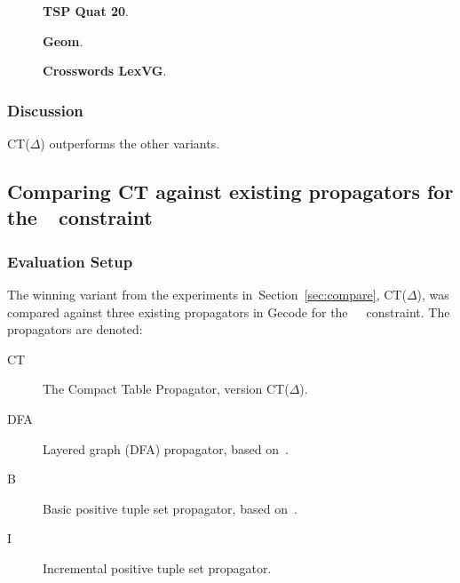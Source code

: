 \documentclass[a4paper,11pt]{article}
\newcommand{\Todo}[1]{{\color{blue}#1}}
\newcommand{\Secref}[1]{Section~\ref{#1}}
\newcommand{\Table}{\Constraint{Table}~}
\numberwithin{equation}{section}
\begin{document}
\begin{figure}
  \begin{minipage}[b][10cm][s]{0.45\textwidth}
    \centering
    \vfill
    \begin{tikzpicture}[scale=0.8]
      
    \end{tikzpicture}
    \vfill
    \caption{\textbf{TSP Quat 20}.}
    \vspace{\baselineskip}
  \end{minipage}\qquad
  \begin{minipage}[b][10cm][s]{0.45\textwidth}
    \centering
    \vfill
    \begin{tikzpicture}[scale=0.8]
      
    \end{tikzpicture}
    \vfill
    \caption{\textbf{Geom}.}
    \vspace{\baselineskip}
  \end{minipage}\qquad
  \begin{minipage}[b][10cm][s]{0.45\textwidth}
    \centering
    \vfill
    \begin{tikzpicture}[scale=0.8]
      
    \end{tikzpicture}
    \vfill
    \caption{\textbf{Crosswords LexVG}.}
    \vspace{\baselineskip}
  \end{minipage} \qquad
\end{figure}

\subsubsection{Discussion}
\Todo{CT($\Delta$) outperforms the other variants.}

\subsection{Comparing CT against existing propagators for the~\Table constraint}

\subsubsection{Evaluation Setup}
The winning variant from the experiments in~\Secref{sec:compare},
CT($\Delta$), was compared against three existing propagators
in Gecode for the~\Table~constraint. The propagators are
denoted:

\begin{description}
  \item[CT] The Compact Table Propagator, version CT($\Delta$).
  \item[DFA] Layered graph (DFA) propagator, based on~\cite{Pesant:seqs}.
  \item[B] Basic positive tuple set propagator, based on~\cite{DBLP:journals/ai/BessiereRYZ05}.
  \item[I] Incremental positive tuple set propagator.
\end{description}
\end{document}
